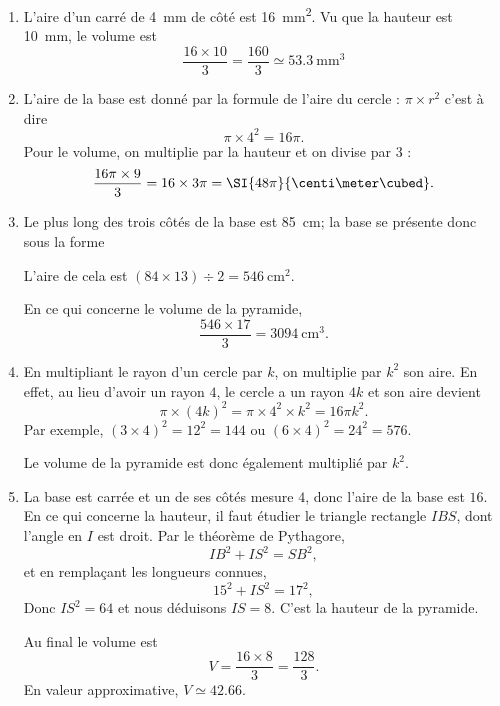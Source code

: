 \begin{enumerate}
    \item
        L'aire d'un carré de \SI{4}{\milli\meter} de côté est \SI{16}{\milli\meter\squared}. Vu que la hauteur est \SI{10}{\milli\meter}, le volume est
        \begin{equation}
            \frac{ 16\times 10 }{ 3 }=\frac{ 160 }{ 3 }\simeq \SI{53.3}{\milli\meter\cubed}
        \end{equation}
    \item
        L'aire de la base est donné par la formule de l'aire du cercle : \( \pi\times r^2\) c'est à dire
        \begin{equation}
            \pi\times 4^2=16\pi.
        \end{equation}
        Pour le volume, on multiplie par la hauteur et on divise par \( 3\) :
        \begin{equation}
            \frac{ 16\pi\times 9 }{ 3 }=16\times 3\pi=\SI{48\pi}{\centi\meter\cubed}.
        \end{equation}
    \item
        Le plus long des trois côtés de la base est \SI{85}{\centi\meter}; la base se présente donc sous la forme
        \begin{center}
            
        \end{center}
        L'aire de cela est \( (84\times 13)\div 2=\SI{546}{\centi\meter\squared}\).

        En ce qui concerne le volume de la pyramide,
        \begin{equation}
            \frac{ 546\times 17 }{ 3 }=\SI{3094}{\centi\meter\cubed}.
        \end{equation}
    \item
    En multipliant le rayon d'un cercle par \( k\), on multiplie par \( k^2\) son aire. En effet, au lieu d'avoir un rayon \( 4\), le cercle a un rayon \( 4k\) et son aire devient
    \begin{equation}
        \pi\times (4k)^2=\pi\times 4^2\times k^2=16\pi k^2.
    \end{equation}
    Par exemple, \( (3\times 4)^2=12^2=144\) ou \( (6\times 4)^2=24^2=576\).

    Le volume de la pyramide est donc également multiplié par \( k^2\).
\item
    La base est carrée et un de ses côtés mesure \( 4\), donc l'aire de la base est \( 16\). En ce qui concerne la hauteur, il faut étudier le triangle rectangle \( IBS\), dont l'angle en \( I\) est droit. Par le théorème de Pythagore,
    \begin{equation}
        IB^2+IS^2=SB^2,
    \end{equation}
    et en remplaçant les longueurs connues,
    \begin{equation}
        15^2+IS^2=17^2,
    \end{equation}
    Donc \( IS^2=64\) et nous déduisons \( IS=8\). C'est la hauteur de la pyramide.

    Au final le volume est
    \begin{equation}
        V=\frac{ 16\times 8 }{ 3 }=\frac{ 128 }{ 3 }.
    \end{equation}
    En valeur approximative, \( V\simeq 42.66\).

\end{enumerate}

